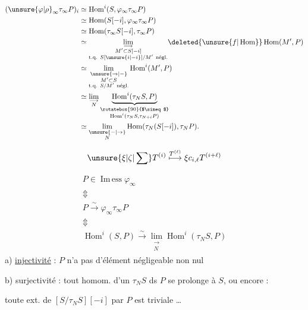 \[
\begin{aligned}
(\unsure{\varphi|\rho}_\infty\tau_\infty P)_{i}
 &\simeq\operatorname{Hom}^i(S,\varphi_\infty\tau_\infty P)\\
 &\simeq\operatorname{Hom}(S[-i],\varphi_\infty\tau_\infty P)\\
 &\simeq\operatorname{Hom}(\tau_\infty S[-i],\tau_\infty P)\\
 &\simeq\underset{\substack{\longrightarrow\\M'\subset S[-i]\\\text{t.q. }S[\unsure{i|-i}]/M'\ \text{négl.}}}{\lim}
 \deleted{\unsure{f|\operatorname{Hom}}}\operatorname{Hom}(M',P)\\
 &\simeq\underset{\substack{\unsure{\rightarrow|-}\\M'\subset S\\\text{t.q. } S/M'\ \text{négl.}}}{\lim}\operatorname{Hom}^i(M',P)\\
 &\simeq\underset{\substack{\longrightarrow\\N}}{\lim}
 \underbrace{\operatorname{Hom}^i(\tau_N S,P)}_{\substack{\rotatebox{90}{$\simeq$}\\\operatorname{Hom}^i(\tau_N S,\tau_{N+i}P)}}\\
 &\simeq\underset{\substack{\unsure{-|\rightarrow}\\N}}{\lim}\operatorname{Hom}(\tau_N(S[-i]),\tau_N P).
\end{aligned}
\]

\[
\unsure{\xi|\zeta|\sum}T^{(i)}\overset{T^{(\ell)}}{\longmapsto}\xi c_{i,\ell}T^{(i+\ell)}
\]

\[
\begin{gathered}
P\in\operatorname{Im\,ess}\varphi_\infty\\
\Updownarrow\\
P\xrightarrow{\sim}\varphi_\infty\tau_\infty P\\
\Updownarrow\\
\operatorname{Hom}^i(S,P)\xrightarrow{\sim}\underset{\substack{\longrightarrow\\N}}{\lim}\operatorname{Hom}^i(\tau_N S,P)
\end{gathered}
\]
a) \uline{injectivité} : $P$ n'a pas d'élément négligeable non nul

b) surjectivité : tout homom.  d'un  $\tau_N S$ ds $P$ se prolonge à $S$, ou encore :

toute ext. de $[S/\tau_N S][-i]$ par $P$ est triviale \ldots
